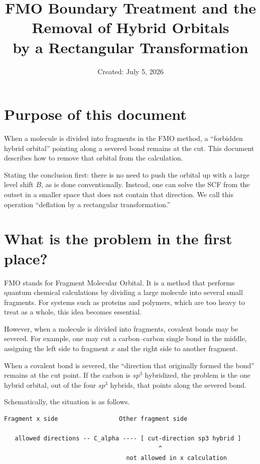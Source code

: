 \documentclass[11pt]{article}
\title{FMO Boundary Treatment and the Removal of Hybrid Orbitals\\
by a Rectangular Transformation}
\author{}
\date{Created: July 5, 2026}
\begin{document}
\maketitle

\section*{Purpose of this document}

When a molecule is divided into fragments in the FMO method, a
``forbidden hybrid orbital'' pointing along a severed bond remains at the
cut. This document describes how to remove that orbital from the
calculation.

Stating the conclusion first: there is no need to push the orbital up
with a large level shift \(B\), as is done conventionally. Instead, one
can solve the SCF from the outset in a smaller space that does not
contain that direction. We call this operation ``deflation by a
rectangular transformation.''

\section{What is the problem in the first place?}

FMO stands for Fragment Molecular Orbital. It is a method that performs
quantum chemical calculations by dividing a large molecule into several
small fragments. For systems such as proteins and polymers, which are
too heavy to treat as a whole, this idea becomes essential.

However, when a molecule is divided into fragments, covalent bonds may
be severed. For example, one may cut a carbon--carbon single bond in the
middle, assigning the left side to fragment \(x\) and the right side to
another fragment.

When a covalent bond is severed, the ``direction that originally formed
the bond'' remains at the cut point. If the carbon is \(sp^3\)
hybridized, the problem is the one hybrid orbital, out of the four
\(sp^3\) hybrids, that points along the severed bond.

Schematically, the situation is as follows.

\begin{verbatim}
Fragment x side                 Other fragment side

   allowed directions -- C_alpha ---- [ cut-direction sp3 hybrid ]
                                           ^
                                  not allowed in x calculation
\end{verbatim}
\end{document}
